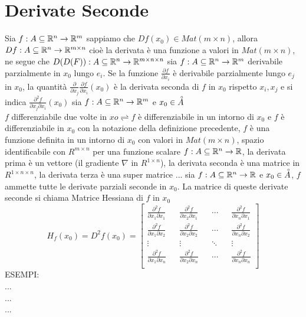 \section{Derivate Seconde}
Sia $f:A\subseteq \mathbb{R}^n \rightarrow \mathbb{R}^m$ sappiamo che $Df(x_0)\in Mat(m\times n)$, allora $Df:A\subseteq \mathbb{R}^{n} \rightarrow \mathbb{R}^{m\times n}$ cioè la derivata è una funzione a valori in $Mat(m\times n)$, ne segue che $D(D(F)):A\subseteq \mathbb{R}^n \rightarrow \mathbb{R}^{m\times n\times n}$
sia $f:A\subseteq \mathbb{R}^n \rightarrow \mathbb{R}^m$ derivabile parzialmente in $x_0$ lungo $e_i$. Se la funzione $\frac{\partial{f}}{\partial{x_i}}$ è derivabile parzialmente lungo $e_j$ in $x_0$, la quantità $\frac{\partial}{\partial{x_j}}\frac{\partial{f}}{\partial{x_i}}(x_0)$ è la derivata seconda di $f$ in $x_0$ rispetto $x_i,x_j$ e si indica $\frac{\partial^2f}{\partial{x_j}\partial{x_i}}(x_0)$
sia $f:A\subseteq \mathbb{R}^n \rightarrow \mathbb{R}^m$ e $x_0\in\accentset{\circ}{A}$\\
$f$ differenziabile due volte in $xo \rightleftharpoons f$ è differenziabile in un intorno di $x_0$ e $f$ è differenziabile in $x_0$
\observation
con la notazione della definizione precedente, $f$ è una funzione definita in un intorno di $x_0$ con valori in $Mat(m\times n)$, spazio identificabile con $R^{m\times n}$
\observation
per una funzione scalare $f:A\subseteq \mathbb{R}^n \rightarrow \mathbb{R}$, la derivata prima è un vettore (il gradiente $\nabla$ in $R^{1\times n}$), la derivata seconda è una matrice in $R^{1\times n \times n}$, la derivata terza è una super matrice ...
sia $f:A\subseteq \mathbb{R}^n \rightarrow \mathbb{R}$ e $x_0\in\accentset{\circ}{A}$, $f$ ammette tutte le derivate parziali seconde in $x_0$. La matrice di queste derivate seconde si chiama Matrice Hessiana di $f$ in $x_0$
$$H_f(x_0)=D^2f(x_0) = \begin{bmatrix}
\frac{\partial^2f}{\partial{x_1}\partial{x_1}} && \frac{\partial^2f}{\partial{x_2}\partial{x_1}} && \dotsb && \frac{\partial^2f}{\partial{x_n}\partial{x_1}} \\
\frac{\partial^2f}{\partial{x_1}\partial{x_2}} && \frac{\partial^2f}{\partial{x_2}\partial{x_2}} && \dotsb && \frac{\partial^2f}{\partial{x_n}\partial{x_2}} \\
\vdots && \vdots && \ddots && \vdots \\
\frac{\partial^2f}{\partial{x_1}\partial{x_n}} && \frac{\partial^2f}{\partial{x_2}\partial{x_n}} && \dotsb && \frac{\partial^2f}{\partial{x_n}\partial{x_n}} \\
\end{bmatrix}$$ 
ESEMPI:\\
...\\
...\\
...\\


